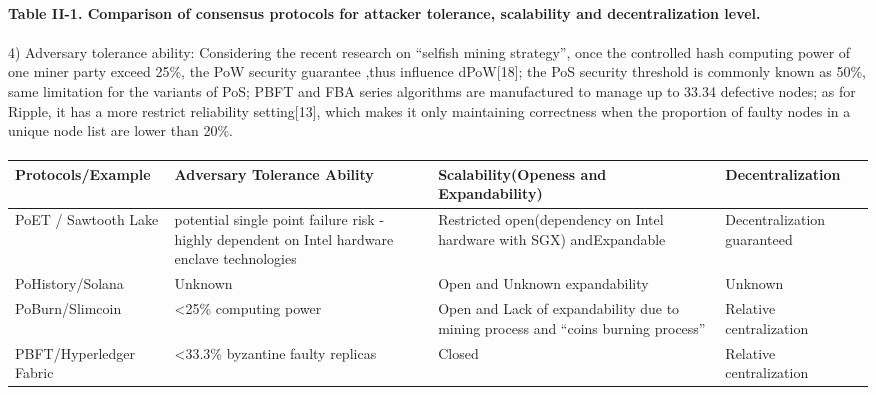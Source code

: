 \documentclass[]{article}
\begin{document}
\begin{CJK*}{UTF8}{gbsn}
\paragraph{Table II-1. Comparison of consensus protocols for attacker tolerance, scalability and decentralization level.}
	\paragraph{} 
4) Adversary tolerance ability:
Considering the recent research on ``selfish mining strategy'', once the controlled hash computing power of one miner party exceed 25\%, the PoW security guarantee ,thus influence dPoW[18]; the PoS security threshold is commonly known as 50\%, same limitation for the variants of PoS; PBFT and FBA series algorithms are manufactured to manage up to 33.34 defective nodes; as for Ripple, it has a more restrict reliability setting[13], which makes it only maintaining correctness when the
proportion of faulty nodes in a unique node list are
lower than 20\%.
  
\paragraph{}
  \begin{tabular}{p{2cm}p{3cm}p{3cm}p{3cm}}
  \hline
 Protocols/E\-xample  & 
Adversary Tolerance Ability & 
Scalability(Openess and Expandability) & Decentralization \\ \hline
PoET / Sawtooth Lake 
 & potential single point failure risk - highly dependent on Intel hardware enclave technologies  
 & Restricted open(dependency on Intel hardware with SGX) and\newline Expandable 
 & Decentralization guaranteed\\ \hline
 
PoHistory/So\-lana 
& Unknown 
& Open and \newline Unknown expandability 
& Unknown \\ \hline

PoBurn/\newline Slimcoin 
& \textless25\% computing power 
& Open and \newline Lack of expandability due to mining process and ``coins burning process'' 
& Relative centralization \\ \hline

PBFT/Hyp\-erledger Fabric
& \textless33.3\% byzantine faulty replicas 
& Closed 
& Relative centralization \\ \hline


\end{tabular}
\end{CJK*}
\end{document}
